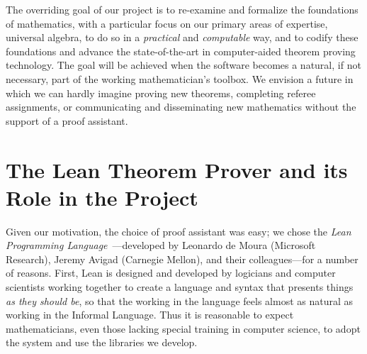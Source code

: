 \documentclass[11pt]{amsart}  %
\begin{document}
The overriding goal of our project is to re-examine and formalize the foundations of 
mathematics, with a particular focus on our primary areas of expertise, universal algebra, to do so in a \emph{practical} and \emph{computable} way, and to codify these foundations and advance the state-of-the-art in computer-aided theorem proving technology. The goal will be achieved when the software becomes a natural, if not necessary, part of the working mathematician's toolbox.  We envision a future in which we can hardly imagine proving new theorems, completing referee assignments, or communicating and disseminating new mathematics without the support of a proof assistant.




\section{The Lean Theorem Prover and its Role in the Project}
Given our motivation, the choice of proof assistant was easy; we chose the \emph{Lean Programming Language}~\cite{lean}---developed by Leonardo de Moura (Microsoft Research), Jeremy Avigad (Carnegie Mellon), and their colleagues---for a number of reasons.
First, Lean is designed and developed by logicians and computer scientists working together to create a language and syntax that presents things \emph{as they should be}, so that the working in the language feels almost as natural as working in the Informal Language. Thus it is reasonable to expect mathematicians, even those lacking special training in computer science, to adopt the system and use the libraries we develop.    
\end{document}
